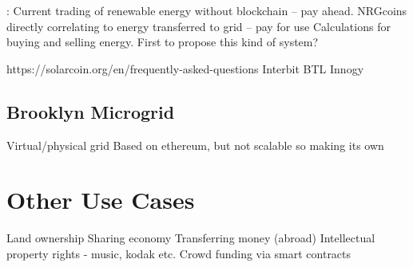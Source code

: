 
\cite{NRGcoin_Mihaylov} : Current trading of renewable energy without blockchain – pay ahead. NRGcoins directly correlating to energy transferred to grid – pay for use Calculations for buying and selling energy. First to propose this kind of system?


https://solarcoin.org/en/frequently-asked-questions
Interbit BTL
Innogy

\subsection{Brooklyn Microgrid}

Virtual/physical grid %
Based on ethereum, but not scalable so making its own


\section{Other Use Cases}
Land ownership
Sharing economy
Transferring money (abroad)
Intellectual property rights - music, kodak etc.  
Crowd funding via smart contracts 